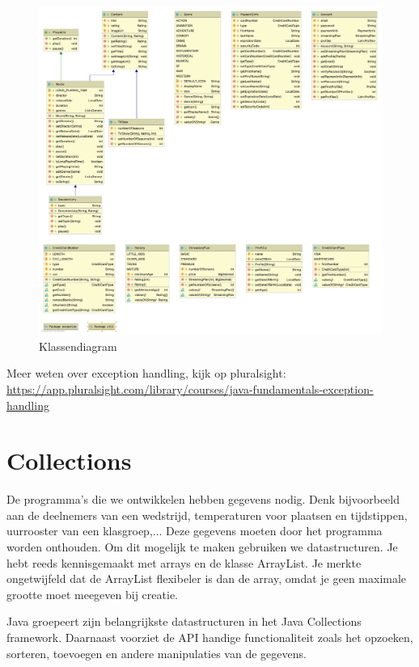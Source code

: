 \documentclass{tstextbook}
\begin{document}
 \begin{figure}[H]
  \includegraphics[width=\linewidth]{images/klassendiagram/diagram_H3.png}
  \caption{Klassendiagram}
  \label{fig:klassendiagram}
\end{figure}
 
\begin{remark}
  Meer weten over exception handling, kijk op pluralsight: \url{https://app.pluralsight.com/library/courses/java-fundamentals-exception-handling}
\end{remark}


\chapter{Collections}

\begin{summary}
De programma's die we ontwikkelen hebben gegevens nodig. Denk bijvoorbeeld aan de deelnemers van een wedstrijd, temperaturen voor plaatsen en tijdstippen, uurrooster van een klasgroep,... Deze gegevens moeten door het programma worden onthouden. Om dit mogelijk te maken gebruiken we datastructuren. Je hebt reeds kennisgemaakt met arrays en de klasse ArrayList. Je merkte ongetwijfeld dat de ArrayList flexibeler is dan de array, omdat je geen maximale grootte moet meegeven bij creatie. 

Java groepeert zijn belangrijkste datastructuren in het Java Collections framework. Daarnaast voorziet de API handige functionaliteit zoals het opzoeken, sorteren, toevoegen en andere manipulaties van de gegevens.
\end{summary}
\end{document}
